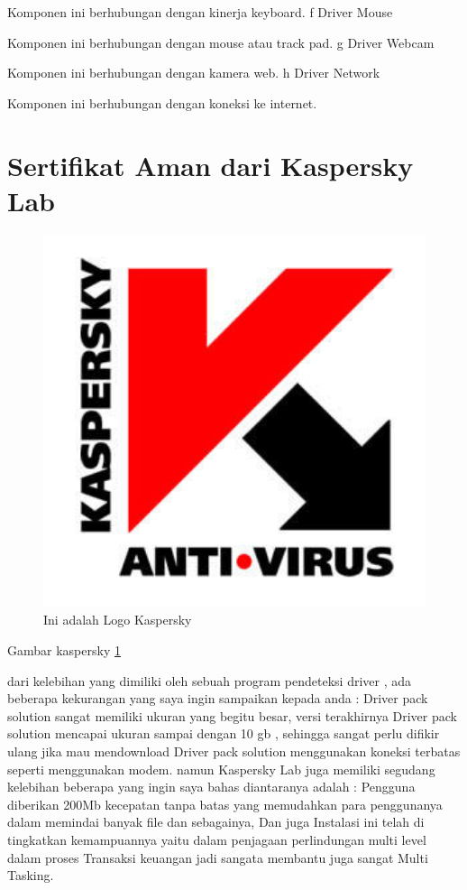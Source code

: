  Komponen ini berhubungan dengan kinerja keyboard.
f	Driver Mouse

 Komponen ini berhubungan dengan mouse atau track pad.
g	Driver Webcam 

 Komponen ini berhubungan dengan kamera web.
h	Driver Network 

 Komponen ini berhubungan dengan koneksi ke internet.


\section{Sertifikat Aman dari Kaspersky Lab}

  \begin{figure}[ht]
  \centerline{\includegraphics[width=1\textwidth]{../figures/Kaspersky.jpg}}
  \caption{Ini adalah Logo Kaspersky}
  \label{kaspersky}
  \end{figure}

Gambar kaspersky \ref{kaspersky}



dari kelebihan yang dimiliki oleh sebuah program pendeteksi driver , ada beberapa kekurangan yang saya ingin sampaikan kepada anda  :
Driver pack solution sangat memiliki ukuran yang begitu besar,  versi terakhirnya Driver pack solution mencapai ukuran sampai dengan 10 gb , sehingga sangat perlu difikir ulang jika mau  mendownload Driver pack solution menggunakan koneksi terbatas seperti menggunakan modem.
namun Kaspersky Lab juga memiliki segudang kelebihan beberapa yang ingin saya bahas diantaranya adalah :
Pengguna diberikan 200Mb kecepatan tanpa batas yang memudahkan para penggunanya dalam memindai banyak file dan sebagainya, Dan juga Instalasi ini telah di tingkatkan kemampuannya yaitu dalam penjagaan perlindungan multi level dalam proses Transaksi keuangan jadi sangata membantu juga sangat Multi Tasking.

